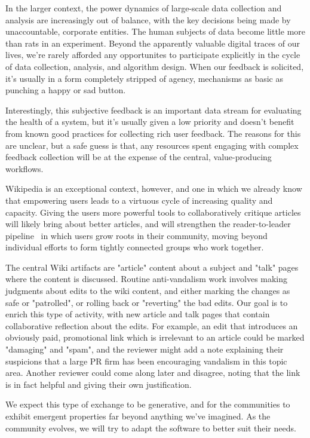 \documentclass{sigchi-ext}
\begin{document}
In the larger context, the power dynamics of large-scale data collection and analysis are increasingly out of balance, with the key decisions being made by unaccountable, corporate entities.  The human subjects of data become little more than rats in an experiment.  Beyond the apparently valuable digital traces of our lives, we're rarely afforded any opportunites to participate explicitly in the cycle of data collection, analysis, and algorithm design.  When our feedback is solicited, it's usually in a form completely stripped of agency, mechanisms as basic as punching a happy or sad button.\cite{levaniemi2012indicator}

Interestingly, this subjective feedback is an important data stream for evaluating the health of a system, but it's usually given a low priority and doesn't benefit from known good practices for collecting rich user feedback.  The reasons for this are unclear, but a safe guess is that, any resources spent engaging with complex feedback collection will be at the expense of the central, value-producing workflows.

Wikipedia is an exceptional context, however, and one in which we already know that empowering users leads to a virtuous cycle of increasing quality and capacity.  Giving the users more powerful tools to collaboratively critique articles will likely bring about better articles, and will strengthen the reader-to-leader pipeline~\cite{preece2009reader} in which users grow roots in their community, moving beyond individual efforts to form tightly connected groups who work together.

The central Wiki artifacts are "article" content about a subject and "talk" pages where the content is discussed.  Routine anti-vandalism work involves making judgments about edits to the wiki content, and either marking the changes as safe or "patrolled", or rolling back or "reverting" the bad edits.  Our goal is to enrich this type of activity, with new article and talk pages that contain collaborative reflection about the edits.  For example, an edit that introduces an obviously paid, promotional link which is irrelevant to an article could be marked "damaging" and "spam", and the reviewer might add a note explaining their suspicions that a large PR firm has been encouraging vandalism in this topic area.  Another reviewer could come along later and disagree, noting that the link is in fact helpful and giving their own justification.

We expect this type of exchange to be generative, and for the communities to exhibit emergent properties far beyond anything we've imagined.  As the community evolves, we will try to adapt the software to better suit their needs.
\end{document}
